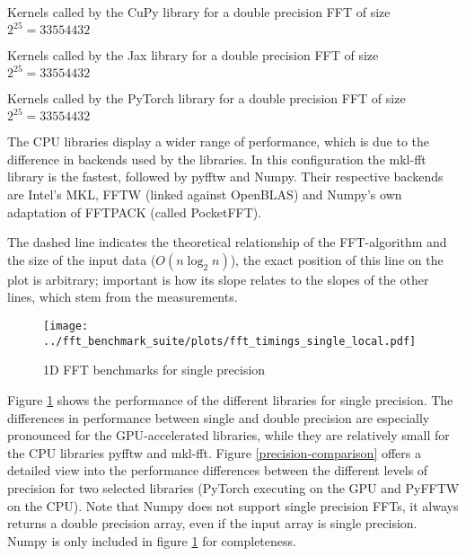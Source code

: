 \documentclass[english,11pt,a4paper,table]{article} %
\begin{document}
\begin{table}[H]
	\centering
	
	\caption{Kernels called by the CuPy library for a double precision FFT of size $2^{25}=33554432$}
	\label{cupy-33554432-double}
\end{table}

\begin{table}[H]
	\centering
	
	\caption{Kernels called by the Jax library for a double precision FFT of size $2^{25}=33554432$}
	\label{jax-33554432-double}
\end{table}

\begin{table}[H]
	\centering
	
	\caption{Kernels called by the PyTorch library for a double precision FFT of size $2^{25}=33554432$}
	\label{pytorch-33554432-double}
\end{table}

The CPU libraries display a wider range of performance, which is due to the difference in backends used by the libraries.
In this configuration the mkl-fft library is the fastest, followed by pyfftw and Numpy.
Their respective backends are Intel's MKL, FFTW (linked against OpenBLAS) and Numpy's own adaptation of FFTPACK (called PocketFFT). \cite{pocketfft}

The dashed line indicates the theoretical relationship of the FFT-algorithm and the size of the input data ($O(n \log_2 n)$), the exact position of this line on the plot is arbitrary; important is how its slope relates to the slopes of the other lines, which stem from the measurements.
\begin{figure}[H]
	\texttt{[image: ../fft\_benchmark\_suite/plots/fft\_timings\_single\_local.pdf]}
	\caption{1D FFT benchmarks for single precision}
	\label{fft_timings_single_local}
\end{figure}

Figure \ref{fft_timings_single_local} shows the performance of the different libraries for single precision.
The differences in performance between single and double precision are especially pronounced for the GPU-accelerated libraries, while they are relatively small for the CPU libraries pyfftw and mkl-fft.
Figure \ref{precision-comparison} offers a detailed view into the performance differences between the different levels of precision for two selected libraries (PyTorch executing on the GPU and PyFFTW on the CPU). 
Note that Numpy does not support single precision FFTs, it always returns a double precision array, even if the input array is single precision. Numpy is only included in figure \ref{fft_timings_single_local} for completeness.
\end{document}
